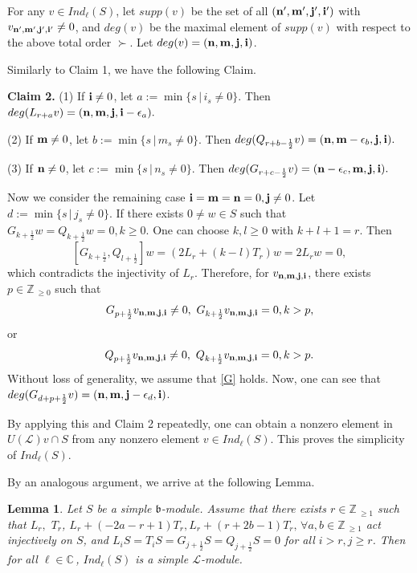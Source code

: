 \documentclass[12pt]{article}
\def\ssc{\scriptscriptstyle}
\def\Z{\mathbb{Z}{\ssc\,}}
\def\C{\mathbb{C}{\ssc\,}}
\numberwithin{equation}{section}
\newtheorem{lemm}[theo]{Lemma}
\begin{document}
For any $v\in Ind_\ell(S)$, let $supp(v)$ be the set of all $({\bf n',m',j',i'})$ with $v_{{\bf n',m',j',i'}}\ne 0$, and $deg(v)$ be the maximal element of $supp(v)$ with respect to the above  total order $\succ$.  Let $deg(v)=({\bf n,m,j,i})$.





 Similarly to Claim 1, we have the following Claim.


{\bf Claim 2.} (1) If ${\bf i}\ne 0$, let $a:=\min\{s\,|\,i_s\ne 0\}.$ Then $deg(L_{r+a}v)=({\bf n,m,j,i}-\epsilon_a).$

(2) If ${\bf m}\ne 0$, let $b:=\min\{s\,|\,m_s\ne 0\}.$ Then $deg(Q_{r+b-\frac{1}{2}}v)=({\bf n,m}-\epsilon_b,{\bf j,i}).$

(3) If ${\bf n}\ne 0$, let $c:=\min\{s\,|\,n_s\ne 0\}.$ Then $deg(G_{r+c-\frac{1}{2}}v)=({\bf n}-\epsilon_c,{\bf m,j,i}).$

Now we consider the remaining case ${\bf i}={\bf m}={\bf n}=0,{\bf j}\ne 0$. Let $d:=\min\{s\,|\,j_s\ne 0\}.$
If there exists $0\ne w\in S$   such that
$  G_{k+\frac{1}{2}}w= Q_{k+\frac{1}{2}}w=0, k\ge 0.$
One can choose $k,l\ge 0$ with $k+l+1=r$. Then
$$[G_{k+\frac{1}{2}}, Q_{l+\frac{1}{2}}]w=(2L_r+(k-l)T_r)w=2L_rw=0,$$
which contradicts the injectivity of $L_r$.
Therefore, for $v_{\bf n,m,j,i}$, there exists $p\in\Z_{\ge 0}$  such that
\begin{equation}\label{G} G_{p+\frac{1}{2}}v_{\bf n,m,j,i}\ne 0,\ G_{k+\frac{1}{2}}v_{\bf n,m,j,i}=0, k>p,\end{equation} or
\begin{equation} Q_{p+\frac{1}{2}}v_{\bf n,m,j,i}\ne 0,\ Q_{k+\frac{1}{2}}v_{\bf n,m,j,i}=0, k>p.\end{equation}
Without loss of  generality, we assume that \eqref{G} holds. Now, one can see that $deg(G_{d+p+\frac{1}{2}} v)=({\bf n,m},{\bf j}-\epsilon_d,{\bf i})$.


By applying this and  Claim 2 repeatedly,  one can obtain a nonzero element in $U(\mathcal{L})v\cap S$ from any nonzero element $v\in Ind_\ell(S)$. This proves the simplicity of $Ind_\ell(S)$.

By an analogous argument,  we arrive at  the following Lemma.
\begin{lemm}\label{LTb-irr} Let   $S$ be a simple $\mathfrak{b}$-module. Assume that there exists $r\in\Z_{\ge 1}$ such that $L_r,$ $T_r$, $L_r+(-2a-r+1)T_r, L_r+(r+2b-1)T_r,\, \forall a,b\in\Z_{\ge 1}$ act injectively on $S$, and  $L_iS=T_iS=G_{j+\frac{1}{2}}S=Q_{j+\frac{1}{2}}S=0$ for all $i>r,j\ge r$. Then for all $\ell\in\C$, $Ind_\ell(S)$ is a simple $\mathcal{L}$-module.
\end{lemm}
\end{document}
